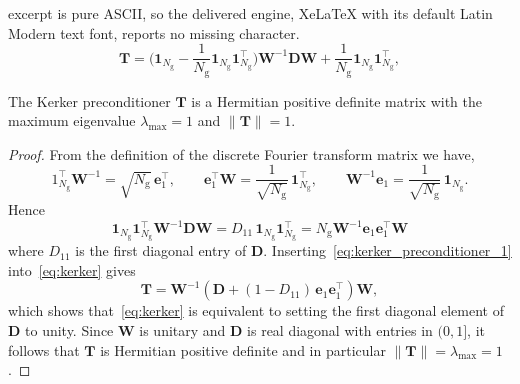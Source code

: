 \documentclass[10pt,a4paper]{amsart}
\newcommand{\Ng}{N_{\mathrm{g}}}
\begin{document}
excerpt is pure ASCII, so the delivered engine, XeLaTeX with its default Latin Modern text font, reports no missing character.
\begin{equation}\label{eq:kerker}
    \bm T = \Big(\bm 1_{\Ng} - \frac{1}{\Ng} \bm 1_{\Ng} \bm 1_{\Ng}^{\top}\Big)
    \bm W^{-1} \bm D \bm W + \frac{1}{\Ng} \bm 1_{\Ng} \bm 1_{\Ng}^{\top},
\end{equation}

\begin{lemma}\label{lem:kerker_properties}
  The Kerker preconditioner $\bm T$ is a Hermitian positive definite matrix
  with the maximum eigenvalue $\lambda_{\max} = 1$ and $\| \bm T \| = 1$.
\end{lemma}

\begin{proof}
From the definition of the discrete Fourier transform matrix we have,
\[
1_{\Ng}^\top \bm W^{-1} = \sqrt{\Ng}\, \bm e_1^\top,\qquad
\bm e_1^\top \bm W = \frac{1}{\sqrt{\Ng}}\, \bm 1_{\Ng}^\top,\qquad
\bm W^{-1} \bm e_1 = \frac{1}{\sqrt{\Ng}}\, \bm 1_{\Ng}.
\]
Hence
\begin{equation}\label{eq:kerker_preconditioner_1}
    \bm 1_{\Ng}\bm 1_{\Ng}^\top \bm W^{-1} \bm D \bm W
    = D_{11}\, \bm 1_{\Ng}\bm 1_{\Ng}^\top = \Ng \bm W^{-1} \bm e_1 \bm e_1^{\top} \bm W
\end{equation}
where $D_{11}$ is the first diagonal entry of $\bm D$.
Inserting~\eqref{eq:kerker_preconditioner_1} into~\eqref{eq:kerker} gives
\[
    \bm T = 
    \bm W^{-1}(\bm D + (1 - D_{11})\, \bm e_1 \bm e_1^{\top}) \bm W,
\]
which shows that~\eqref{eq:kerker} is equivalent to setting
the first diagonal element of $\bm D$ to unity.
Since $\bm W$ is unitary and $\bm D$ is real diagonal with
entries in $(0,1]$, it follows that $\bm T$ is Hermitian positive definite
and in particular $\|\bm T\|=\lambda_{\max}=1$.
\end{proof}
\end{document}

